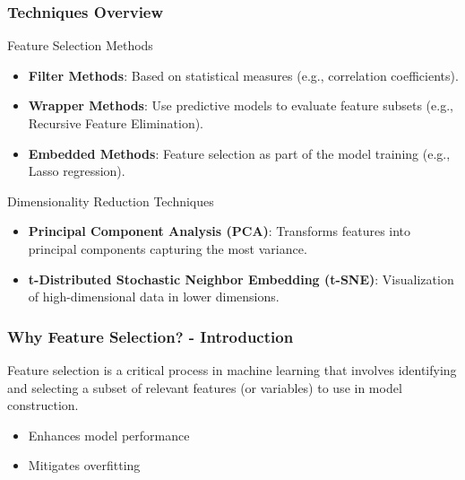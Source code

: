 \documentclass{beamer}
\begin{document}
\begin{frame}[fragile]
    \frametitle{Techniques Overview}
    \begin{block}{Feature Selection Methods}
        \begin{itemize}
            \item \textbf{Filter Methods}: Based on statistical measures (e.g., correlation coefficients).
            \item \textbf{Wrapper Methods}: Use predictive models to evaluate feature subsets (e.g., Recursive Feature Elimination).
            \item \textbf{Embedded Methods}: Feature selection as part of the model training (e.g., Lasso regression).
        \end{itemize}
    \end{block}
    
    \begin{block}{Dimensionality Reduction Techniques}
        \begin{itemize}
            \item \textbf{Principal Component Analysis (PCA)}: Transforms features into principal components capturing the most variance.
            \item \textbf{t-Distributed Stochastic Neighbor Embedding (t-SNE)}: Visualization of high-dimensional data in lower dimensions.
        \end{itemize}
    \end{block}
\end{frame}

\begin{frame}[fragile]
    \frametitle{Why Feature Selection? - Introduction}
    Feature selection is a critical process in machine learning that involves identifying and selecting a subset of relevant features (or variables) to use in model construction. 
    \begin{itemize}
        \item Enhances model performance
        \item Mitigates overfitting
    \end{itemize}
\end{frame}
\end{document}
